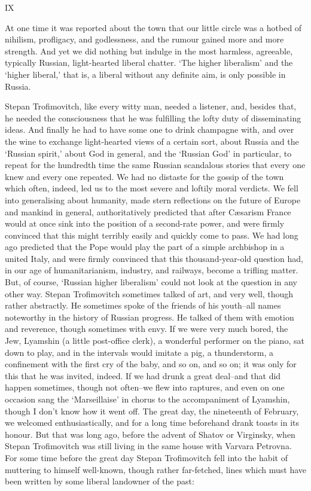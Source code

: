 \documentclass[12pt]{article}
\begin{document}
\vspace{12pt}
IX


\vspace{12pt}
At one time it was reported about the town that our little circle was a
hotbed of nihilism, profligacy, and godlessness, and the rumour gained
more and more strength. And yet we did nothing but indulge in the most
harmless, agreeable, typically Russian, light-hearted liberal chatter.
`The higher liberalism' and the `higher liberal,' that is, a liberal
without any definite aim, is only possible in Russia.


\vspace{12pt}
Stepan Trofimovitch, like every witty man, needed a listener, and,
besides that, he needed the consciousness that he was fulfilling the
lofty duty of disseminating ideas. And finally he had to have some one
to drink champagne with, and over the wine to exchange light-hearted
views of a certain sort, about Russia and the `Russian spirit,' about
God in general, and the `Russian God' in particular, to repeat for the
hundredth time the same Russian scandalous stories that every one knew
and every one repeated. We had no distaste for the gossip of the town
which often, indeed, led us to the most severe and loftily moral
verdicts. We fell into generalising about humanity, made stern
reflections on the future of Europe and mankind in general,
authoritatively predicted that after Cæsarism France would at once sink
into the position of a second-rate power, and were firmly convinced that
this might terribly easily and quickly come to pass. We had long ago
predicted that the Pope would play the part of a simple archbishop in
a united Italy, and were firmly convinced that this thousand-year-old
question had, in our age of humanitarianism, industry, and railways,
become a trifling matter. But, of course, `Russian higher liberalism'
could not look at the question in any other way. Stepan Trofimovitch
sometimes talked of art, and very well, though rather abstractly. He
sometimes spoke of the friends of his youth--all names noteworthy in
the history of Russian progress. He talked of them with emotion and
reverence, though sometimes with envy. If we were very much bored, the
Jew, Lyamshin (a little post-office clerk), a wonderful performer on
the piano, sat down to play, and in the intervals would imitate a pig,
a thunderstorm, a confinement with the first cry of the baby, and so on,
and so on; it was only for this that he was invited, indeed. If we had
drunk a great deal--and that did happen sometimes, though not often--we
flew into raptures, and even on one occasion sang the `Marseillaise' in
chorus to the accompaniment of Lyamshin, though I don't know how it
went off. The great day, the nineteenth of February, we welcomed
enthusiastically, and for a long time beforehand drank toasts in its
honour. But that was long ago, before the advent of Shatov or Virginsky,
when Stepan Trofimovitch was still living in the same house with Varvara
Petrovna. For some time before the great day Stepan Trofimovitch
fell into the habit of muttering to himself well-known, though rather
far-fetched, lines which must have been written by some liberal
landowner of the past:
\end{document}
